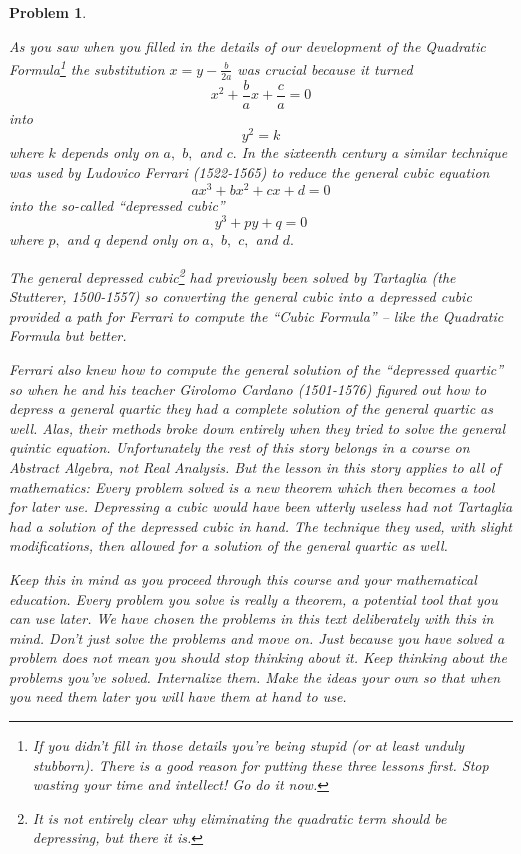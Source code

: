 \documentclass[oneside]{book}
\def\LabelProblem#1#2{\label{#1}\addcontentsline{toc}{subsection}{\hskip1cm Problem~\ref{#1}}}
\newtheorem{problem}{Problem}
\begin{document}
\begin{problem}
\LabelProblem{prob:Quadratic Formula-Tartaglia's Method}{Quadratic
  Formula!First Alternate Method}
  As you saw when you filled in the details of our development of the
  Quadratic Formula\footnote{If you didn't fill in those details
    you're being stupid (or at least unduly stubborn). There is a good reason for putting these three
    lessons first. Stop wasting your time and intellect! Go do it
    now.} the substitution $x=y-\frac{b}{2a}$ was crucial because it
  turned 
$$
x^2+\frac{b}{a}x +\frac{c}{a}=0
$$
into
$$
y^2=k
$$
where $k$ depends only on $a,$ $b,$ and $c.$ In the sixteenth century
a similar technique was used by Ludovico Ferrari (1522-1565) to reduce
the general cubic equation
\begin{equation}
ax^3+bx^2+cx+d=0\label{eq:GenCubic}
\end{equation}
into the so-called ``depressed cubic''
$$
y^3 +py+q=0
$$
where $p,$ and $q$ depend only on $a,$ $b,$ $c,$ and $d.$ 

The general depressed cubic\footnote{It is not entirely clear why
  eliminating the quadratic term should be depressing, but there it
  is.} had previously been solved by Tartaglia (the Stutterer,
1500-1557) so converting the general cubic into a depressed cubic
provided a path for Ferrari to compute the ``Cubic Formula'' -- like the
Quadratic Formula but better. 

Ferrari also knew how to compute the general solution of the
``depressed quartic'' so when he and his teacher Girolomo Cardano
(1501-1576) figured out how to depress a general quartic they had a
complete solution of the general quartic as well. Alas, their methods
broke down entirely when they tried to solve the general quintic
equation. Unfortunately the rest of this story belongs in a course on
Abstract Algebra, not Real Analysis.  But the lesson in this story
applies to all of mathematics: Every problem solved is a new theorem
which then becomes a tool for later use. Depressing a cubic would have
been utterly useless had not Tartaglia had a solution of the depressed
cubic in hand. The technique they used, with slight modifications,
then allowed for a solution of the general quartic as well.

Keep this in mind as you proceed through this course and your
mathematical education. Every problem you solve is really a theorem, a
potential tool that you can use later. We have chosen the problems in
this text deliberately with this in mind. Don't just solve the
problems and move on. Just because you have solved a problem does not
mean you should stop thinking about it. Keep thinking about the
problems you've solved. Internalize them. Make the ideas your own so
that when you need them later you will have them at hand to use.



\end{problem}
\end{document}
